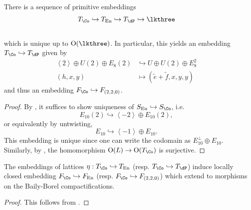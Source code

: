\documentclass{amsart}
\renewcommand{\tilde}{\widetilde}
\begin{document}
\begin{lemma}

There is a sequence of primitive embeddings \[
T_{\Co} \hookrightarrow T_{\operatorname{En}} \hookrightarrow T_{\dP} \hookrightarrow\lkthree
\]\\
which is unique up to \({\operatorname{O}}(\lkthree)\). In particular, this yields an embedding \(T_{\Co}\hookrightarrow T_{\dP}\) given by \begin{align*}     \left\langle{2}\right\rangle \oplus U(2) \oplus E_8(2) &\hookrightarrow U \oplus U(2) \oplus E_8^2 \\     (h,x,y) & \mapsto (\tilde e + \tilde f, x, y, y) \end{align*} and thus an embedding \(F_{\Co} \hookrightarrow F_{(2,2,0)}\).

\end{lemma}

\begin{proof}

By \cite[Lem.\,2.4]{AEGS23}, it suffices to show uniqueness of \(S_{\operatorname{En}} \hookrightarrow S_{\Co}\), i.e. \[
E_{10}(2) \hookrightarrow\left\langle{-2}\right\rangle\oplus E_{10}(2)
,\] or equivalently by untwisting, \[
E_{10} \hookrightarrow\left\langle{-1}\right\rangle\oplus E_{10}
.\] This embedding is unique since one can write the codomain as \(E_{10}^\perp \oplus E_{10}\). Similarly, by \cite[Cor.\,1.5.2, Thm.\,3.6.3]{nikulin1979integer-symmetric}, the homomorphism \({\operatorname{O}}(L)\to {\operatorname{O}}(T_{\Co})\) is surjective.

\end{proof}

\begin{lemma}

\label{lem:lattice-embeddings-induce-morphisms} The embeddings of lattices \(\eta: T_{\Co}\hookrightarrow T_{\operatorname{En}}\) (resp. \(T_{\Co} \hookrightarrow T_{\dP}\)) induce locally closed embedding \(F_{\Co} \hookrightarrow F_{\operatorname{En}}\) (resp. \(F_{\Co} \hookrightarrow F_{(2,2,0)}\)) which extend to morphisms on the Baily-Borel compactifications.

\end{lemma}

\begin{proof}

This follows from \cite[\S 5, Thm.\,2]{kiernan1972satake-compactification}.

\end{proof}
\end{document}
